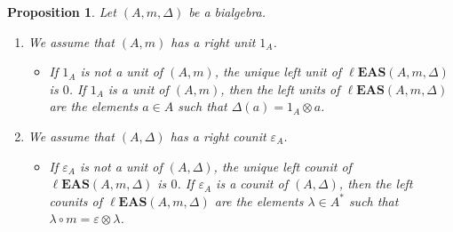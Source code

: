 \documentclass[pdftex]{sigma}
\numberwithin{equation}{section}
\newtheorem{Proposition}[Theorem]{Proposition}
 { \theoremstyle{definition}
\newtheorem{Definition}[Theorem]{Definition}
\newtheorem{Note}[Theorem]{Note}
\newtheorem{Example}[Theorem]{Example}
\newtheorem{Remark}[Theorem]{Remark}
\newtheorem{Notation}[Theorem]{Notation}}
\newcommand{\leas}{\ell\mathbf{EAS}}
\begin{document}
\begin{Proposition}\label{prop5.4}
Let $(A,m,\Delta)$ be a bialgebra.
\begin{enumerate}\itemsep=0pt
\item[$(1)$] We assume that $(A,m)$ has a right unit $1_A$.
\begin{itemize}\itemsep=0pt
\item If $1_A$ is not a unit of $(A,m)$, the unique left unit of $\leas(A,m,\Delta)$ is $0$. If $1_A$ is a unit of $(A,m)$, then the left units of $\leas(A,m,\Delta)$ are the elements $a\in A$ such that $\Delta(a)=1_A\otimes a$.
\end{itemize}
\item[$(2)$] We assume that $(A,\Delta)$ has a right counit $\varepsilon_A$.
\begin{itemize}\itemsep=0pt
\item If $\varepsilon_A$ is not a unit of $(A,\Delta)$, the unique left counit of $\leas(A,m,\Delta)$ is $0$. If $\varepsilon_A$ is a counit of $(A,\Delta)$, then the left counits of $\leas(A,m,\Delta)$ are the elements $\lambda \in A^*$
such that $\lambda \circ m=\varepsilon\otimes \lambda$.
\end{itemize}\end{enumerate}\end{Proposition}
\end{document}
